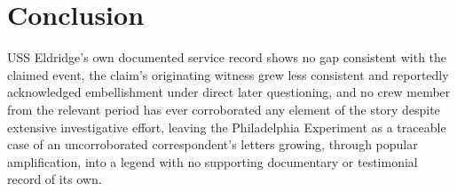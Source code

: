 \documentclass[11pt]{article}
\begin{document}
\section{Conclusion}

USS Eldridge's own documented service record shows no gap consistent with the claimed event, the claim's originating witness grew less consistent and reportedly acknowledged embellishment under direct later questioning, and no crew member from the relevant period has ever corroborated any element of the story despite extensive investigative effort, leaving the Philadelphia Experiment as a traceable case of an uncorroborated correspondent's letters growing, through popular amplification, into a legend with no supporting documentary or testimonial record of its own.
\end{document}
